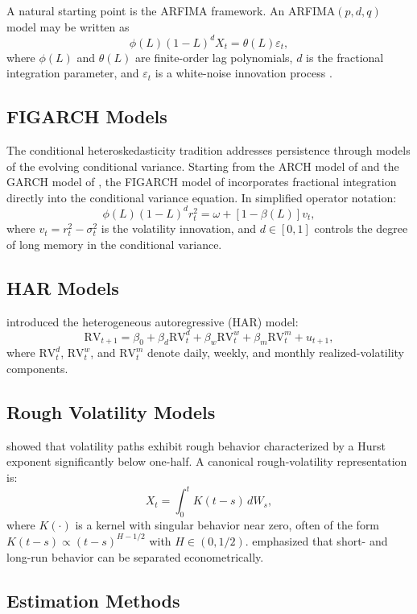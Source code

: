 \documentclass[12pt]{article}
\begin{document}
A natural starting point is the ARFIMA framework. An ARFIMA$(p,d,q)$ model may be written as
\[
\phi(L)(1-L)^d X_t = \theta(L) \varepsilon_t,
\]
where $\phi(L)$ and $\theta(L)$ are finite-order lag polynomials, $d$ is the fractional integration parameter, and $\varepsilon_t$ is a white-noise innovation process \citep{GrangerJoyeux1980, Hosking1981}.

\subsection{FIGARCH Models}

The conditional heteroskedasticity tradition addresses persistence through models of the evolving conditional variance. Starting from the ARCH model of \citet{Engle1982} and the GARCH model of \citet{Bollerslev1986}, the FIGARCH model of \citet{Baillie1996} incorporates fractional integration directly into the conditional variance equation. In simplified operator notation:
\[
\phi(L)(1-L)^d r_t^2 = \omega + [1 - \beta(L)] v_t,
\]
where $v_t = r_t^2 - \sigma_t^2$ is the volatility innovation, and $d \in [0,1]$ controls the degree of long memory in the conditional variance.

\subsection{HAR Models}

\citet{Corsi2009} introduced the heterogeneous autoregressive (HAR) model:
\[
\mathrm{RV}_{t+1} = \beta_0 + \beta_d \mathrm{RV}_t^d + \beta_w \mathrm{RV}_t^w + \beta_m \mathrm{RV}_t^m + u_{t+1},
\]
where $\mathrm{RV}_t^d$, $\mathrm{RV}_t^w$, and $\mathrm{RV}_t^m$ denote daily, weekly, and monthly realized-volatility components.

\subsection{Rough Volatility Models}

\citet{Gatheral2018} showed that volatility paths exhibit rough behavior characterized by a Hurst exponent significantly below one-half. A canonical rough-volatility representation is:
\[
X_t = \int_0^t K(t-s)\, dW_s,
\]
where $K(\cdot)$ is a kernel with singular behavior near zero, often of the form $K(t-s) \propto (t-s)^{H-1/2}$ with $H \in (0, 1/2)$. \citet{Bennedsen2021} emphasized that short- and long-run behavior can be separated econometrically.

\subsection{Estimation Methods}
\end{document}
